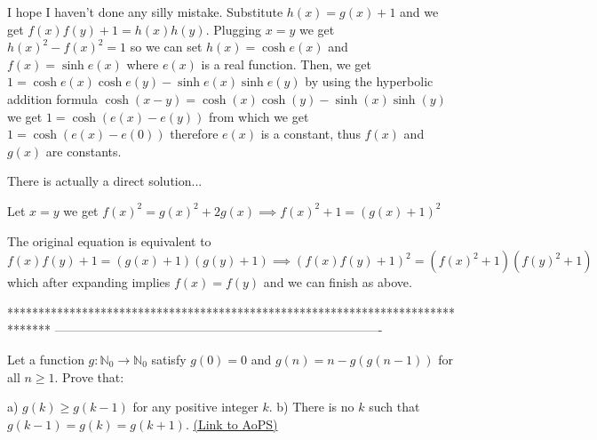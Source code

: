 \begin{solution}
	I hope I haven't done any silly mistake. Substitute $ h(x)=g(x)+1 $ and we get $f(x)f(y)+1=h(x)h(y)$. Plugging $x=y$ we get $ h(x)^2-f(x)^2=1 $ so we can set $ h(x)=\cosh e(x) $ and $ f(x)=\sinh e(x) $ where $ e(x) $ is a real function. Then, we get $ 1= \cosh e(x) \cosh e(y) - \sinh e(x) \sinh e(y) $ by using the hyperbolic addition formula $ \cosh (x-y)=\cosh (x)\cosh (y) -\sinh(x) \sinh(y) $ we get $ 1= \cosh (e(x)-e(y)) $ from which we get $ 1=\cosh (e(x)-e(0)) $ therefore $ e(x) $ is a constant, thus $ f(x) $ and $ g(x) $ are constants.
\end{solution}



\begin{solution}
	There is actually a direct solution...

Let $x=y$ we get $f(x)^2 = g(x)^2 + 2g(x) \implies f(x)^2+1 = (g(x)+1)^2$

The original equation is equivalent to \[f(x)f(y) +1 = (g(x) +1)(g(y)+1) \implies (f(x)f(y)+1)^2= (f(x)^2+1)(f(y)^2+1)\] which after expanding implies $ f(x) = f(y)$ and we can finish as above.
\end{solution}
*******************************************************************************
-------------------------------------------------------------------------------

\begin{problem}
	Let a function $g:\mathbb{N}_0\to\mathbb{N}_0$ satisfy $g(0)=0$ and $g(n)=n-g(g(n-1))$ for all $n\ge 1$. Prove that:

a) $g(k)\ge g(k-1)$ for any positive integer $k$.
b) There is no $k$ such that $g(k-1)=g(k)=g(k+1)$.
	\flushright \href{https://artofproblemsolving.com/community/c6h408646}{(Link to AoPS)}
\end{problem}



